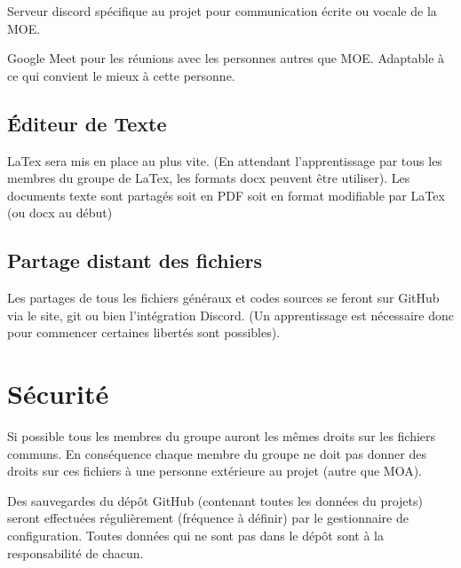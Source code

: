 \documentclass[a4paper]{article}%
\begin{document}
        
        Serveur discord spécifique au projet pour communication écrite ou vocale de la MOE.
        
        
        Google Meet pour les réunions avec les personnes autres que MOE. Adaptable à ce qui convient le mieux à cette personne.
        
        \subsection{Éditeur de Texte}
        LaTex sera mis en place au plus vite. (En attendant l’apprentissage par tous les membres du groupe de LaTex, les formats docx peuvent être utiliser).
        Les documents texte sont partagés soit en PDF soit en format modifiable par LaTex (ou docx au début)
        
        \subsection{Partage distant des fichiers}
        Les partages de tous les fichiers généraux et codes sources se feront sur GitHub via le site, git ou bien l’intégration Discord. (Un apprentissage est nécessaire donc pour commencer certaines libertés sont possibles).
        
    \section{Sécurité}
    Si possible tous les membres du groupe auront les mêmes droits sur les fichiers communs. En conséquence chaque membre du groupe ne doit pas donner des droits sur ces fichiers à une personne extérieure au projet (autre que MOA).
    
    
    Des sauvegardes du dépôt GitHub (contenant toutes les données du projets) seront effectuées régulièrement (fréquence à définir) par le gestionnaire de configuration. Toutes données qui ne sont pas dans le dépôt sont à la responsabilité de chacun.
    
\end{document}
